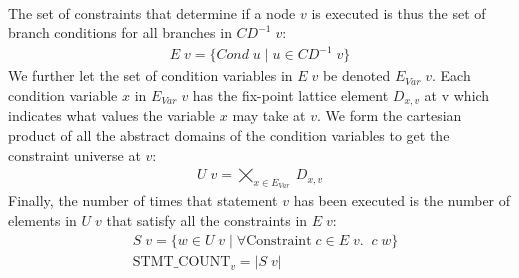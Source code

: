 \documentclass[a4paper]{article}
\newcommand{\NL}[0]{ \hfill\\\noindent }
\begin{document}
\NL
The set of constraints that determine if a node $v$ is executed is thus the set of branch conditions for all branches in $CD^{-1}\;v$:
\begin{align*}
E\;v = \{ Cond\;u\;|\;u \in CD^{-1}\;v \}
\end{align*}
\noindent
We further let the set of condition variables in $E\;v$ be denoted $E_{Var}\;v$. Each condition variable $x$ in $E_{Var}\;v$ has the fix-point lattice element $D_{x,v}$ at v which indicates what values the variable $x$ may take at $v$. We form the cartesian product of all the abstract domains of the condition variables to get the constraint universe at $v$:
\begin{align*}
U\;v = \bigtimes_{ x \in E_{Var}\;} D_{x,v}
\end{align*}
\noindent
Finally, the number of times that statement $v$ has been executed is the number of elements in $U\;v$ that satisfy all the constraints in $E\;v$:
\begin{align*}
&S\;v = \{ w \in U\;v\;|\; \forall \text{Constraint} \; c \in E\;v. \;\; c\;w\}\\
&\text{STMT\_COUNT}_v = |S\;v|
\end{align*}
\end{document}
